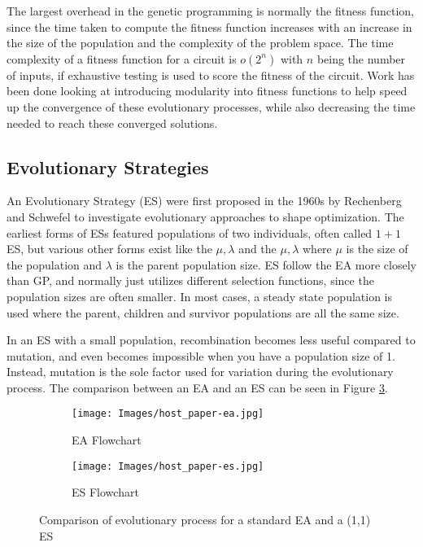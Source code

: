 \documentclass[conference]{IEEEtran}
\begin{document}
{\par The largest overhead in the genetic programming is normally the fitness function, since the time taken to compute the fitness function increases with an increase in the size of the population and the complexity of the problem space.
The time complexity of a fitness function for a circuit is $o(2^n)$ with $n$ being the number of inputs, if exhaustive testing is used to score the fitness of the circuit. 
Work has been done looking at introducing modularity into fitness functions to help speed up the convergence of these evolutionary processes, while also decreasing the time needed to reach these converged solutions. %

\subsection{Evolutionary Strategies}
\label{ea:es}
An Evolutionary Strategy (ES) were first proposed in the 1960s by Rechenberg and Schwefel to investigate evolutionary approaches to shape optimization\cite{beyer2002evolution}.
The earliest forms of ESs featured populations of two individuals, often called $1+1$ ES, but various other forms exist like the $\mu,\lambda$ and the $\mu,\lambda$ where $\mu$ is the size of the population and $\lambda$ is the parent population size.
ES follow the EA more closely than GP, and normally just utilizes different selection functions, since the population sizes are often smaller.
In most cases, a steady state population is used where the parent, children and survivor populations are all the same size.

\par In an ES with a small population, recombination becomes less useful compared to mutation, and even becomes impossible when you have a population size of 1.
Instead, mutation is the sole factor used for variation during the evolutionary process.
The comparison between an EA and an ES can be seen in Figure \ref{fig:ea_vs_es}.

\begin{figure}[t]
    \centering
     \begin{subfigure}[b]{0.2\textwidth}
         \centering
         \texttt{[image: Images/host\_paper-ea.jpg]}
         \caption{EA Flowchart}
         \label{fig:ea_flowchart}
     \end{subfigure}
     \hfill
     \begin{subfigure}[b]{0.2\textwidth}
         \centering
         \texttt{[image: Images/host\_paper-es.jpg]}
         \caption{ES Flowchart}
         \label{fig:es_flowcahrt}
     \end{subfigure}
     \caption{Comparison of evolutionary process for a standard EA and a (1,1) ES}
     \label{fig:ea_vs_es}
\end{figure}

}
\end{document}
